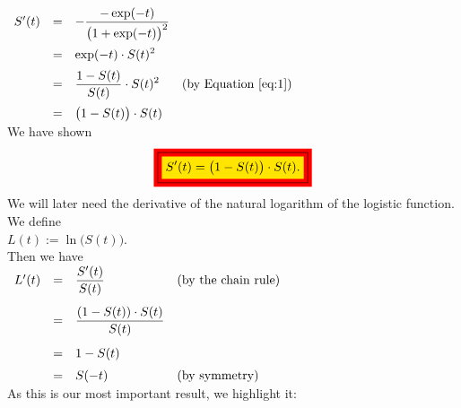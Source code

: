 \hspace*{1.3cm}
$
\begin{array}{lcll}
 S'(t) & = & \displaystyle -\frac{-\exp(-t)}{\bigr(1+\exp(-t)\bigr)^2}   \\[0.5cm]
       & = & \displaystyle \exp(-t) \cdot S(t)^2                         \\[0.2cm]
       & = & \displaystyle \frac{1-S(t)}{S(t)} \cdot S(t)^2  & \mbox{(by Equation \ref{eq:1})} \\[0.4cm]
       & = & \displaystyle \bigl(1 - S(t)\bigr) \cdot S(t)            
\end{array}
$
\\[0.2cm]
We have shown
\begin{equation}
  \label{eq:2}
  \colorbox{red}{\framebox{\colorbox{orange}{\mbox{$\ds S'(t) = \bigl(1 - S(t)\bigr) \cdot S(t)$.}}}}
\end{equation}
We will later need the derivative of the natural logarithm of the logistic function.  We define
\\[0.2cm]
\hspace*{1.3cm}
$L(t) := \ln\bigl(S(t)\bigr)$.
\\[0.2cm]
Then we have
\\[0.2cm]
\hspace*{1.3cm}
$
\begin{array}{lcll}
  L'(t) & = & \displaystyle \frac{S'(t)}{S(t)}                  & \mbox{(by the chain rule)} \\[0.5cm]
        & = & \displaystyle \frac{(1 - S(t)) \cdot S(t)}{S(t)}                               \\[0.5cm]
        & = & \displaystyle 1 - S(t)                                                         \\[0.2cm]
        & = & \displaystyle S(-t)                               & \mbox{(by symmetry)} 
\end{array}
$
\\[0.2cm]
As this is our most important result, we highlight it:
\\[0.2cm]
\hspace*{1.3cm}
\colorbox{red}{}


